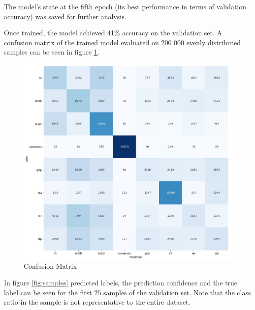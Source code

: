 \documentclass[conference]{IEEEtran}
\begin{document}
The model's state at the fifth epoch (its best performance in terms of validation accuracy) was saved for further analysis.

Once trained, the model achieved 41\% accuracy on the validation set. A confusion matrix of the trained model evaluated on 200 000 evenly distributed samples can be seen in figure \ref{fig:confusion-matrix}.

\begin{figure}
    \centering
    \includegraphics[scale=0.25]{confusion-matrix.png}
    \caption{Confusion Matrix}
    \label{fig:confusion-matrix}
\end{figure}

In figure \ref{fig:samples} predicted labels, the prediction confidence and the true label can be seen for the first 25 samples of the validation set. Note that the class ratio in the sample is not representative to the entire dataset.
\end{document}
